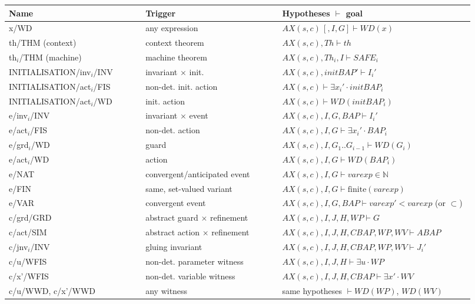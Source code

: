 \documentclass[11pt,a4paper]{article}
\newcommand{\nat}{\mathbb{N}}
\newcommand{\WD}{\mathit{WD}}
\newcommand{\AX}{\mathit{AX}(s,c)}
\newcommand{\Th}{\mathit{Th}}
\newcommand{\po}[1]{\textsf{\small #1}}
\begin{document}
\begin{longtable}{p{0.27\linewidth} p{0.27\linewidth} p{0.38\linewidth}}
\toprule
\textbf{Name} & \textbf{Trigger} & \textbf{Hypotheses $\vdash$ goal}\\ \midrule\endhead
\po{x/WD} & any expression & $\AX\,[,I,G] \vdash \WD(x)$\\
\po{th/THM} (context) & context theorem & $\AX,\Th\vdash th$\\
\po{th$_i$/THM} (machine) & machine theorem & $\AX,\Th_i,I\vdash \mathit{SAFE}_i$\\
\po{INITIALISATION/inv$_i$/INV} & invariant $\times$ init. & $\AX,\mathit{initBAP}'\vdash I_i'$\\
\po{INITIALISATION/act$_i$/FIS} & non-det. init. action & $\AX\vdash\exists x_i'\cdot\mathit{initBAP}_i$\\
\po{INITIALISATION/act$_i$/WD} & init. action & $\AX\vdash\WD(\mathit{initBAP}_i)$\\
\po{e/inv$_i$/INV} & invariant $\times$ event & $\AX,I,G,\mathit{BAP}\vdash I_i'$\\
\po{e/act$_i$/FIS} & non-det. action & $\AX,I,G\vdash\exists x_i'\cdot\mathit{BAP}_i$\\
\po{e/grd$_i$/WD} & guard & $\AX,I,G_1..G_{i-1}\vdash \WD(G_i)$\\
\po{e/act$_i$/WD} & action & $\AX,I,G\vdash \WD(\mathit{BAP}_i)$\\
\po{e/NAT} & convergent/anticipated event & $\AX,I,G\vdash \mathit{varexp}\in\nat$\\
\po{e/FIN} & same, set-valued variant & $\AX,I,G\vdash \mathrm{finite}(\mathit{varexp})$\\
\po{e/VAR} & convergent event & $\AX,I,G,\mathit{BAP}\vdash \mathit{varexp}'<\mathit{varexp}$ (or $\subset$)\\
\po{c/grd/GRD} & abstract guard $\times$ refinement & $\AX,I,J,H,\mathit{WP}\vdash G$\\
\po{c/act/SIM} & abstract action $\times$ refinement & $\AX,I,J,H,\mathit{CBAP},\mathit{WP},\mathit{WV}\vdash \mathit{ABAP}$\\
\po{c/jnv$_i$/INV} & gluing invariant & $\AX,I,J,H,\mathit{CBAP},\mathit{WP},\mathit{WV}\vdash J_i'$\\
\po{c/u/WFIS} & non-det. parameter witness & $\AX,I,J,H\vdash\exists u\cdot \mathit{WP}$\\
\po{c/x'/WFIS} & non-det. variable witness & $\AX,I,J,H,\mathit{CBAP}\vdash\exists x'\cdot \mathit{WV}$\\
\po{c/u/WWD}, \po{c/x'/WWD} & any witness & same hypotheses $\vdash\WD(\mathit{WP})$, $\WD(\mathit{WV})$\\

\end{longtable}
\end{document}
